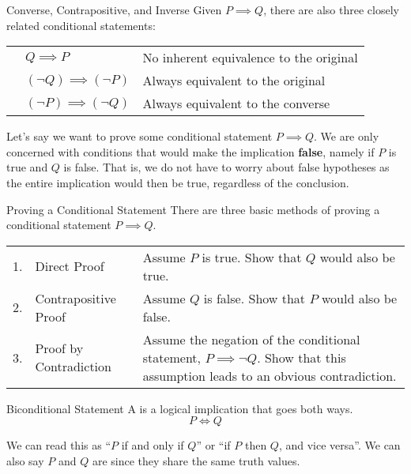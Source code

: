 \documentclass[letterpaper,12pt]{report}
\begin{document}
\begin{dfnbox}{Converse, Contrapositive, and Inverse}{}
	Given $P \implies Q$, there are also three closely related conditional statements:
	\begin{center}\begin{tabular}{lll}
			\dfntxt{Converse} & $Q\implies P$ & No inherent equivalence to the original \\
			\dfntxt{Contrapositive} & $(\neg Q) \implies (\neg P)$ & Always equivalent to the original \\
			\dfntxt{Inverse} & $(\neg P) \implies (\neg Q)$ & Always equivalent to the converse
		\end{tabular}\end{center}
\end{dfnbox}

Let's say we want to prove some conditional statement $P \implies Q$. We are only concerned with conditions that would make the implication \textbf{false}, namely if $P$ is true and $Q$ is false. That is, we do not have to worry about false hypotheses as the entire implication would then be true, regardless of the conclusion.

\begin{tecbox}{Proving a Conditional Statement}{}
	There are three basic methods of proving a conditional statement $P \implies Q$.
	\tcblower
	\begin{center}\begin{tabularx}{\linewidth}{llX}
		1. & Direct Proof & Assume $P$ is true. Show that $Q$ would also be true. \\
		2. & Contrapositive Proof & Assume $Q$ is false. Show that $P$ would also be false. \\
		3. & Proof by Contradiction & Assume the negation of the conditional statement, $P \implies \neg Q$. Show that this assumption leads to an obvious contradiction.
	\end{tabularx}\end{center}
\end{tecbox}

\begin{dfnbox}{Biconditional Statement}{}
    A  is a logical implication that goes both ways.
	\tcblower
	\[P \iff Q\]
\end{dfnbox}

We can read this as ``$P$ if and only if $Q$'' or ``if $P$ then $Q$, and vice versa''. We can also say $P$ and $Q$ are  since they share the same truth values.
\end{document}
